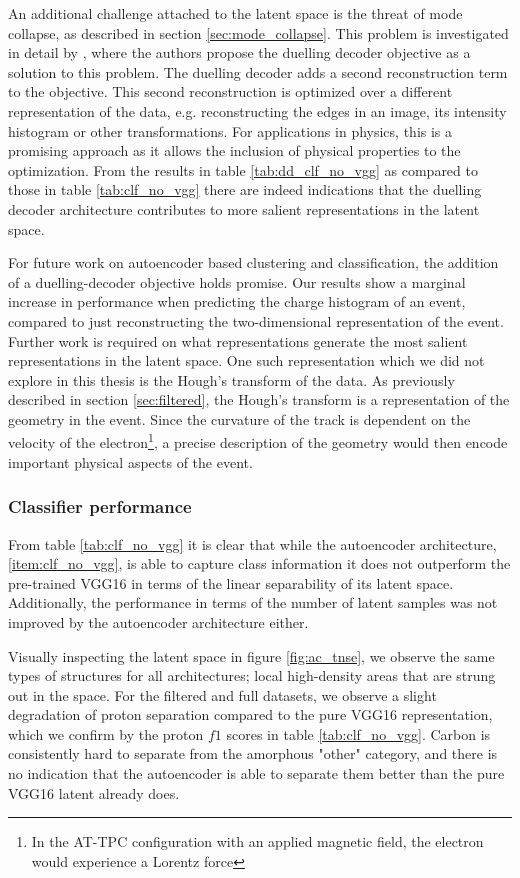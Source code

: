 An additional challenge attached to the latent space is the threat of mode collapse, as described in section \ref{sec:mode_collapse}. This problem is investigated in detail by \citet{Seybold2019}, where the authors propose the duelling decoder objective as a solution to this problem. The duelling decoder adds a second reconstruction term to the objective. This second reconstruction is optimized over a different representation of the data, e.g. reconstructing the edges in an image, its intensity histogram or other transformations. For applications in physics, this is a promising approach as it allows the inclusion of physical properties to the optimization. From the results in table \ref{tab:dd_clf_no_vgg} as compared to those in table \ref{tab:clf_no_vgg} there are indeed indications that the duelling decoder architecture contributes to more salient representations in the latent space. 

For future work on autoencoder based clustering and classification, the addition of a duelling-decoder objective holds promise. Our results show a marginal increase in performance when predicting the charge histogram of an event, compared to just reconstructing the two-dimensional representation of the event. Further work is required on what representations generate the most salient representations in the latent space. One such representation which we did not explore in this thesis is the Hough's transform of the data. As previously described in section \ref{sec:filtered}, the Hough's transform is a representation of the geometry in the event. Since the curvature of the track is dependent on the velocity of the electron\footnote{In the AT-TPC configuration with an applied magnetic field, the electron would experience a Lorentz force}, a precise description of the geometry would then encode important physical aspects of the event.


\subsubsection{Classifier performance}

From table \ref{tab:clf_no_vgg} it is clear that while the autoencoder architecture, \ref{item:clf_no_vgg}, is able to capture class information it does not outperform the pre-trained VGG16 in terms of the linear separability of its latent space. Additionally, the performance in terms of the number of latent samples was not improved by the autoencoder architecture either. 

Visually inspecting the latent space in figure \ref{fig:ac_tnse}, we observe the same types of structures for all architectures; local high-density areas that are strung out in the space. For the filtered and full datasets, we observe a slight degradation of proton separation compared to the pure VGG16 representation, which we confirm by the proton $f1$ scores in table \ref{tab:clf_no_vgg}. Carbon is consistently hard to separate from the amorphous "other" category, and there is no indication that the autoencoder is able to separate them better than the pure VGG16 latent already does. 


